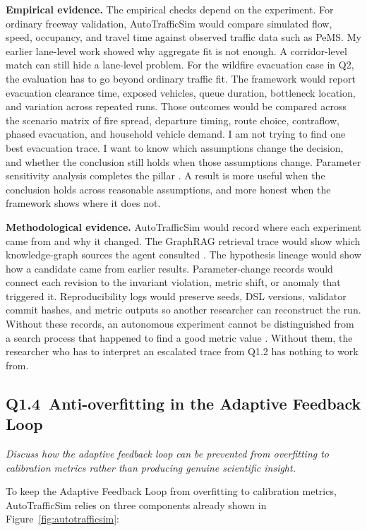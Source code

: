 \begin{bibunit}[plainnat]
\textbf{Empirical evidence.} The empirical checks depend on the experiment.
For ordinary freeway validation, AutoTrafficSim would compare simulated
flow, speed, occupancy, and travel time against observed traffic data such
as PeMS. My earlier lane-level work showed why aggregate fit is not enough.
A corridor-level match can still hide a lane-level problem. For the wildfire
evacuation case in Q2, the evaluation has to go beyond ordinary traffic fit.
The framework would report evacuation clearance time, exposed vehicles,
queue duration, bottleneck location, and variation across repeated runs.
Those outcomes would be compared across the scenario matrix of fire spread,
departure timing, route choice, contraflow, phased evacuation, and household
vehicle demand. I am not trying to find one best evacuation trace. I want to
know which assumptions change the decision, and whether the conclusion still
holds when those assumptions change. Parameter sensitivity analysis
completes the pillar \citep{sargent2010verification,law1991simulation}. A
result is more useful when the conclusion holds across reasonable
assumptions, and more honest when the framework shows where it does not.

\textbf{Methodological evidence.} AutoTrafficSim would record where each
experiment came from and why it changed. The GraphRAG retrieval trace would
show which knowledge-graph sources the agent consulted
\citep{edge2024local}. The hypothesis lineage would show how a candidate
came from earlier results. Parameter-change records would connect each
revision to the invariant violation, metric shift, or anomaly that triggered
it. Reproducibility logs would preserve seeds, DSL versions, validator
commit hashes, and metric outputs so another researcher can reconstruct the
run. Without these records, an autonomous experiment cannot be distinguished
from a search process that happened to find a good metric value
\citep{rabanser2026towards}. Without them, the researcher who has to
interpret an escalated trace from Q1.2 has nothing to work from.

\subsection{Q1.4\ Anti-overfitting in the Adaptive Feedback Loop}

\textit{Discuss how the adaptive feedback loop can be prevented from overfitting to calibration metrics rather than producing genuine scientific insight.}

To keep the Adaptive Feedback Loop from overfitting to calibration metrics,
AutoTrafficSim relies on three components already shown in
Figure~\ref{fig:autotrafficsim}:


\end{bibunit}
